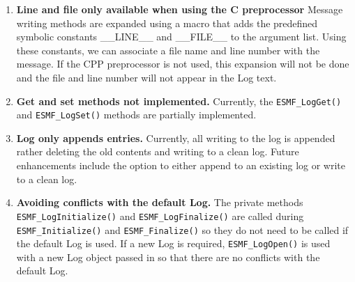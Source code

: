 %

\begin{enumerate}

\item {\bf Line and file only available when using the C preprocessor}
Message writing methods are expanded using a macro that adds the predefined 
symbolic constants \_\_LINE\_\_ and \_\_FILE\_\_ to the argument list.
Using these constants, we can associate a file name and line number with the
message.  If the CPP preprocessor is not used, this expansion will not be done
and the file and line number will not appear in the Log text.

\item{\bf Get and set methods not implemented.}
Currently, the {\tt ESMF\_LogGet()} and {\tt ESMF\_LogSet()} methods are 
partially implemented.   

\item{\bf Log only appends entries.}
Currently, all writing to the log is appended rather deleting the old contents
and writing to a clean log.  Future enhancements include the option to either
append to an existing log or write to a clean log.

\item{\bf Avoiding conflicts with the default Log.}
The private methods {\tt ESMF\_LogInitialize()} and {\tt ESMF\_LogFinalize()} 
are called during {\tt ESMF\_Initialize()} and {\tt ESMF\_Finalize()} so they
do not need to be called if the default Log is used.  If a new Log is required,
{\tt ESMF\_LogOpen()} is used with a new Log object passed in so that there 
are no conflicts with the default Log.

\end{enumerate}
